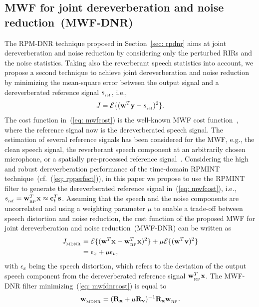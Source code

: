 \documentclass[10pt]{IEEEtran}
\begin{document}
\subsection{MWF for joint dereverberation and noise reduction~(MWF-DNR)}
\label{sec: mwfdnr}
The RPM-DNR technique proposed in Section~\ref{sec: rpdnr} aims at joint dereverberation and noise reduction by considering only the perturbed RIRs and the noise statistics. 
Taking also the reverberant speech statistics into account, we propose a second technique to achieve joint dereverberation and noise reduction by minimizing the mean-square error between the output signal and a dereverberated reference signal $s_{_{\rm ref}}$, i.e., 
\begin{equation}
\label{eq: mwfcost}
J = {\cal{E}} \{( \mathbf{w}^T\mathbf{y} - s_{_{\rm ref}} )^2 \}.
\end{equation}
The cost function in~(\ref{eq: mwfcost}) is the well-known MWF cost function~\cite{Doclo_SC_2007}, where the reference signal now is the dereverberated speech signal.
The estimation of several reference signals has been considered for the MWF, e.g., the clean speech signal, the reverberant speech component at an arbitrarily chosen microphone, or a spatially pre-processed reference signal~\cite{Spriet_SP_2004,Doclo_IWAENC_2001,Habets_ITASLP_2013}.
{{Considering the high and robust dereverberation performance of the time-domain RPMINT technique~(cf.~(\ref{eq: rpperfect})), in this paper we propose to use the RPMINT filter to generate the dereverberated reference signal in~(\ref{eq: mwfcost}), i.e., $s_{_{\rm ref}} = \mathbf{w}_{_{\rm RP}}^T\mathbf{x} \approx \mathbf{c}_t^T\mathbf{s}$.}}
Assuming that the speech and the noise components are uncorrelated and using a weighting parameter $\mu$ to enable a trade-off between speech distortion and noise reduction, the cost function of the proposed MWF for joint dereverberation and noise reduction~(MWF-DNR) can be written as
\begin{align}
  \label{eq: mwfdnrcost}
  J_{_{\rm MDNR}} & = {\cal{E}}\{(\mathbf{w}^T\mathbf{x} - \mathbf{w}_{_{\rm RP}}^T\mathbf{x})^2 \} + \mu{\cal{E}}\{(\mathbf{w}^T\mathbf{v})^2 \} \\
  & = \epsilon_{x} + \mu \epsilon_v,
\end{align}
with $\epsilon_{x}$ being the speech distortion, which refers to the deviation of the output speech component from the dereverberated reference signal $\mathbf{w}_{_{\rm RP}}^T\mathbf{x}$.
The MWF-DNR filter minimizing~(\ref{eq: mwfdnrcost}) is equal to
\begin{equation}
  \label{eq: mwfdnrsol}
\mathbf{w}_{_{\rm MDNR}} = (\mathbf{R}_{\mathbf{x}} + \mu \mathbf{R}_{\mathbf{v}})^{-1}\mathbf{R}_{\mathbf{x}}\mathbf{w}_{_{\rm RP}}.
\end{equation}
\end{document}
